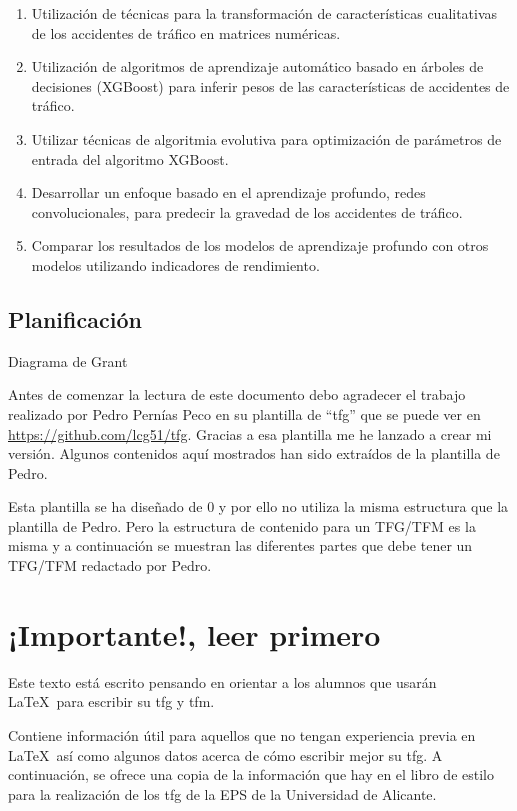 		\begin{enumerate}
		    \item Utilización de técnicas para la transformación de características cualitativas de los accidentes de tráfico en matrices numéricas.
		    \item Utilización de algoritmos de aprendizaje automático basado en árboles de decisiones (XGBoost) para inferir pesos de las características de accidentes de tráfico.
		    \item Utilizar técnicas de algoritmia evolutiva para optimización de parámetros de entrada del algoritmo XGBoost.
		    \item Desarrollar un enfoque basado en el aprendizaje profundo, redes convolucionales, para predecir la gravedad de los accidentes de tráfico.
		    \item Comparar los resultados de los modelos de aprendizaje profundo con otros modelos utilizando indicadores de rendimiento.
		\end{enumerate}



	\subsection{Planificación}

	Diagrama de Grant


Antes de comenzar la lectura de este documento debo agradecer el trabajo realizado por Pedro Pernías Peco en su plantilla de ``tfg'' que se puede ver en \url{https://github.com/lcg51/tfg}. Gracias a esa plantilla me he lanzado a crear mi versión. Algunos contenidos aquí mostrados han sido extraídos de la plantilla de Pedro. 
\\
\par Esta plantilla se ha diseñado de 0 y por ello no utiliza la misma estructura que la plantilla de Pedro. Pero la estructura de contenido para un TFG/TFM es la misma y a continuación se muestran las diferentes partes que debe tener un TFG/TFM redactado por Pedro.
\section{¡Importante!, leer primero}

Este texto está escrito pensando en orientar a los alumnos que usarán \LaTeX~para escribir su \gls{tfg} y \gls{tfm}. 
\\
\par Contiene información útil para aquellos que no tengan experiencia previa en \LaTeX~así como algunos datos acerca de cómo escribir mejor su \gls{tfg}.
A continuación, se ofrece una copia de la información que hay en el libro de estilo para la realización de los \gls{tfg} de la EPS de la Universidad de Alicante.

